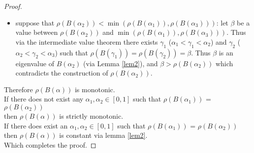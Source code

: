 \begin{proof}
\begin{itemize}[leftmargin=*,labelsep=4mm]
\item   suppose that $\rho(B(\alpha_2))<\min(\rho(B(\alpha_1)),\rho(B(\alpha_3)))$: let $\beta$ be a value between $\rho(B(\alpha_2))$ and $\min(\rho(B(\alpha_1)),\rho(B(\alpha_3)))$. Thus via the intermediate value theorem there exists $\gamma_1$ ($\alpha_1<\gamma_1<\alpha_2$) and $\gamma_2$ ($\alpha_2<\gamma_2<\alpha_3$) such that $\rho(B(\gamma_1))=\rho(B(\gamma_2))=\beta$. Thus $\beta$ is an eigenvalue of $B(\alpha_2)$ (via Lemma \ref{lem2}), and $\beta > \rho(B(\alpha_2))$ which contradicts the construction of $\rho(B(\alpha_2))$.
\end{itemize}
Therefore $\rho(B(\alpha))$ is monotonic.\\
If there does not exist any $\alpha_1,\alpha_2\in[0,1]$ such that $\rho(B(\alpha_1))$ = $\rho(B(\alpha_2))$\\
\-\hspace{8mm}then $\rho(B(\alpha))$ is strictly monotonic.\\
If there does exist an $\alpha_1,\alpha_2\in[0,1]$ such that $\rho(B(\alpha_1))$ = $\rho(B(\alpha_2))$\\
\-\hspace{8mm}then $\rho(B(\alpha))$ is constant via lemma \ref{lem2}.\\
Which completes the proof.
\end{proof}

\pagebreak

